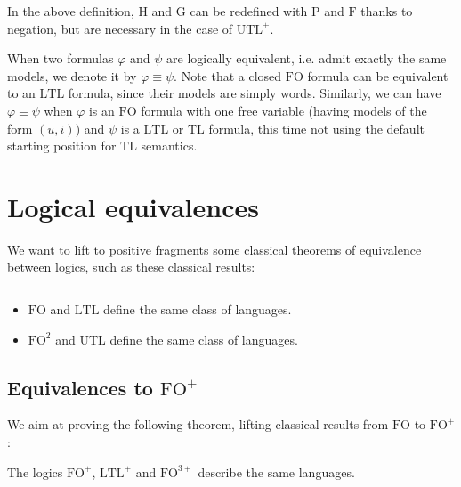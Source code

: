 \documentclass[a4paper,UKenglish,cleveref, autoref, thm-restate]{lipics-v2021}
\newcommand{\FO}{\mathrm{FO}}
\newcommand{\FOp}{\FO^+}
\newcommand{\FOthp}{\FO^{3+}}
\newcommand{\FOtw}{\FO^2}
\newcommand{\LTL}{\mathrm{LTL}}
\newcommand{\LTLp}{\LTL^+}
\newcommand{\TL}{\mathrm{TL}}
\newcommand{\UTL}{\mathrm{UTL}}
\newcommand{\UTLp}{\UTL^+}
\renewcommand{\P}{\mathrm{P}}
\newcommand{\F}{\mathrm{F}}
\renewcommand{\H}{\mathrm{H}}
\newcommand{\G}{\mathrm{G}}
\begin{document}
\begin{remark}
    In the above definition, $\H$ and $\G$ can be redefined with $\P$ and $\F$ thanks to negation, but are necessary in the case of $\UTLp$.
\end{remark}



When two formulas $\varphi$ and $\psi$ are logically equivalent, i.e. admit exactly the same models, we denote it by $\varphi \equiv \psi$. Note that a closed  $\FO$ formula can be equivalent to an $\LTL$ formula, since their models are simply words. Similarly, we can have $\varphi\equiv\psi$ when $\varphi$ is an $\FO$ formula with one free variable (having models of the form $(u,i)$) and $\psi$ is a $\LTL$ or $\TL$ formula, this time not using the default starting position for $\TL$ semantics.




\section{Logical equivalences} \label{sec:equiv}



We want to lift to positive fragments some classical theorems of equivalence between logics, such as these classical results:

\begin{theorem}$ $
\begin{itemize}
\item $\FO$ and $\LTL$ define the same class of languages.
\item $\FOtw$ and $\UTL$ define the same class of languages.
\end{itemize}
\end{theorem}


\subsection{\texorpdfstring{Equivalences to $\FOp$}{Equivalences to FO+}} \label{sec:equivFO+}

We aim at proving the following theorem, lifting classical results from $\FO$ to $\FOp$:


\begin{theorem}\label{equiv}
    The logics $\FOp$, $\LTLp$ and $\FOthp$ describe the same languages.
\end{theorem}
\end{document}
